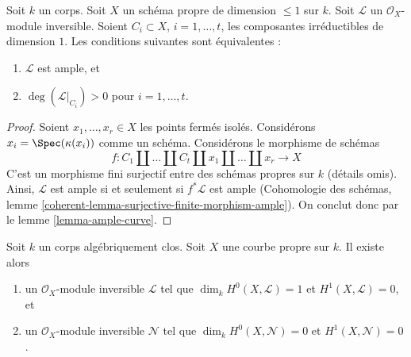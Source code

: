 \begin{lemma}
\label{lemma-ampleness-in-terms-of-degrees-components}
Soit $k$ un corps. Soit $X$ un schéma propre de dimension $\leq 1$
sur $k$. Soit $\mathcal{L}$ un $\mathcal{O}_X$-module inversible.
Soient $C_i \subset X$, $i = 1, \ldots, t$, les composantes irréductibles
de dimension $1$. Les conditions suivantes sont équivalentes :
\begin{enumerate}
\item $\mathcal{L}$ est ample, et
\item $\deg(\mathcal{L}|_{C_i}) > 0$ pour $i = 1, \ldots, t$.
\end{enumerate}
\end{lemma}

\begin{proof}
Soient $x_1, \ldots, x_r \in X$ les points fermés isolés.
Considérons $x_i = \Spec(\kappa(x_i))$ comme un schéma.
Considérons le morphisme de schémas
$$
f : C_1 \amalg \ldots \amalg C_t \amalg x_1 \amalg \ldots \amalg x_r
\longrightarrow X
$$
C'est un morphisme fini surjectif entre des schémas propres sur $k$
(détails omis). Ainsi, $\mathcal{L}$ est ample si et seulement si
$f^*\mathcal{L}$ est ample (Cohomologie des schémas, lemme
\ref{coherent-lemma-surjective-finite-morphism-ample}).
On conclut donc par le lemme \ref{lemma-ample-curve}.
\end{proof}

\begin{lemma}
\label{lemma-general-degree-g-line-bundle}
Soit $k$ un corps algébriquement clos. Soit $X$ une courbe propre sur $k$.
Il existe alors
\begin{enumerate}
\item un $\mathcal{O}_X$-module inversible $\mathcal{L}$ tel que
$\dim_k H^0(X, \mathcal{L}) = 1$ et $H^1(X, \mathcal{L}) = 0$, et
\item un $\mathcal{O}_X$-module inversible $\mathcal{N}$ tel que
$\dim_k H^0(X, \mathcal{N}) = 0$ et $H^1(X, \mathcal{N}) = 0$.
\end{enumerate}
\end{lemma}

